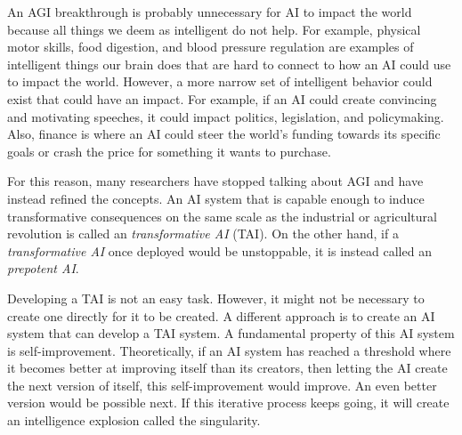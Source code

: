 \documentclass[12pt,A4]{report}
\theoremstyle{definition}
\begin{document}
An AGI breakthrough is probably unnecessary for AI to impact the world because all things we deem as intelligent do not help. For example, physical motor skills, food digestion, and blood pressure regulation are examples of intelligent things our brain does that are hard to connect to how an AI could use to impact the world. However, a more narrow set of intelligent behavior could exist that could have an impact. For example, if an AI could create convincing and motivating speeches, it could impact politics, legislation, and policymaking. Also, finance is where an AI could steer the world's funding towards its specific goals or crash the price for something it wants to purchase. 

For this reason, many researchers have stopped talking about AGI and have instead refined the concepts\autocite{Critch Kruger}. An AI system that is capable enough to induce transformative consequences on the same scale as the industrial or agricultural revolution is called an \textit{transformative AI} (TAI). On the other hand, if a \textit{transformative AI} once deployed would be unstoppable, it is instead called an \textit{prepotent AI}. 

Developing a TAI is not an easy task. However, it might not be necessary to create one directly for it to be created\autocite{Superintelligence}. A different approach is to create an AI system that can develop a TAI system. A fundamental property of this AI system is self-improvement. Theoretically, if an AI system has reached a threshold where it becomes better at improving itself than its creators, then letting the AI create the next version of itself, this self-improvement would improve. An even better version would be possible next. If this iterative process keeps going, it will create an intelligence explosion called the singularity\autocite{Yudkowsky}.  
\end{document}
